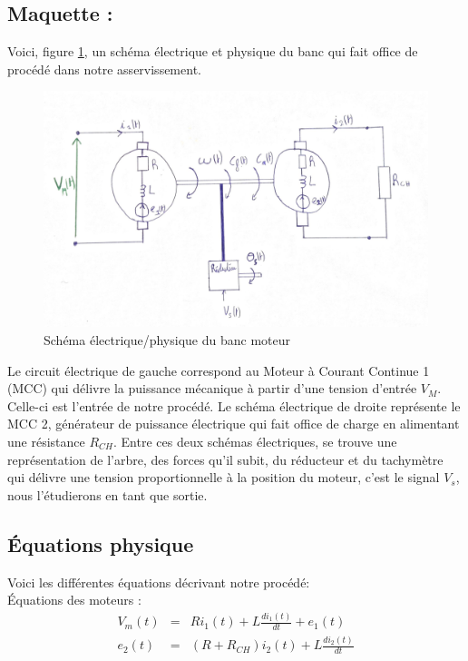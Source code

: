 \subsection{Maquette :}
Voici, figure \ref{fig:schema0}, un schéma électrique et physique du banc qui fait office de procédé dans notre asservissement.
\begin{figure}[!ht]
\centering
\includegraphics[width=.8\textwidth]{./I/images/schema0.png}
\caption{\label{fig:schema0}Schéma électrique/physique du banc moteur}
\end{figure}
Le circuit électrique de gauche correspond au Moteur à Courant Continue 1 (MCC) qui délivre la puissance mécanique à partir d'une tension d'entrée $V_M$. Celle-ci est l'entrée de notre procédé. Le schéma électrique de droite représente le MCC 2, générateur de puissance électrique qui fait office de charge en alimentant une résistance $R_{CH}$. Entre ces deux schémas électriques, se trouve une représentation de l'arbre, des forces qu'il subit, du réducteur et du tachymètre qui délivre une tension proportionnelle à la position du moteur, c'est le signal $V_s$, nous l'étudierons en tant que sortie. 

\subsection{Équations physique}\label{sub:equationPhysique}
Voici les différentes équations décrivant notre procédé:\\
\noindent\hspace{3mm}\textbullet  \hspace{1mm} Équations des moteurs :
\begin{eqnarray}
V_m(t)  					&=& 	R i_1(t) + L \frac{d   i_1(t)}{d t} + e_1(t) \\
e_2(t) 						&=& 	(R+R_{CH}) i_2(t) + L \frac{d i_2(t)}{d t}
\end{eqnarray}

